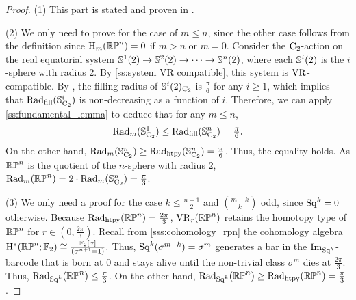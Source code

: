 \begin{proof}
	(1) This part is stated and proven in \cite[Thm.~4.5]{adams2022metric}.

	\smallskip (2) We only need to prove for the case of $m\leq n$, since the other case follows from the definition since \(\mathrm{H}_m(\mathbb{RP}^n) = 0\) if \(m > n\) or \(m = 0\).
    Consider the \(\mathrm{C}_2\)-action on the real equatorial system \(\mathbb{S}^{1}(2) \to \mathbb{S}^{2}(2) \to \dotsb \to \mathbb{S}^{n}(2)\), where each $\mathbb{S}^{i}(2)$ is the $i$-sphere with radius $2$.
    By \cref{ss:system VR compatible}, this system is \(\mathrm{VR}\)-compatible.
    By \cite{katz1983filling}, the filling radius of $\mathbb{S}^{i}(2)_{\mathrm{C}_2}$ is $\frac{\pi}{6}$ for any $i \geq 1$, which implies that $\mathrm{Rad}_{\mathrm{fill}}(\mathbb{S}^{i}_{\mathrm{C}_2})$ is non-decreasing as a function of \(i\).
    Therefore, we can apply \cref{ss:fundamental_lemma} to deduce that for any \(m \leq n\),
    \[
    \mathrm{Rad}_{m}(\mathbb{S}^{1}_{\mathrm{C}_2}) \leq \mathrm{Rad}_{\mathrm{fill}}(\mathbb{S}^{n}_{\mathrm{C}_2}) = \tfrac{\pi}{6}.
    \]
    On the other hand, $\mathrm{Rad}_{m}(\mathbb{S}^{n}_{\mathrm{C}_2})\geq \mathrm{Rad}_{\mathrm{htpy}}(\mathbb{S}^{n}_{\mathrm{C}_2}) = \tfrac{\pi}{6}$.
    Thus, the equality holds.
    As $\mathbb{RP}^n$ is the quotient of the $n$-sphere with radius $2$, $\mathrm{Rad}_{m}(\mathbb{RP}^n) = 2\cdot \mathrm{Rad}_{m}(\mathbb{S}^{n}_{\mathrm{C}_2}) = \frac{\pi}{3}$.


	\smallskip (3) We only need a proof for the case $k \leq \frac{n-1}{2}$ and $\binom{m-k}{k}$ odd, since \(\mathrm{Sq}^k = 0\) otherwise.
	Because $\mathrm{Rad}_{\mathrm{htpy}}(\mathbb{RP}^n)=\frac{2\pi}{3}$, $\mathrm{VR}_r(\mathbb{RP}^n)$ retains the homotopy type of $\mathbb{RP}^n$ for $r \in (0,\tfrac{2\pi}{3})$.
    Recall from \cref{sss:cohomology_rpn} the cohomology algebra \(\mathrm{H}^\ast(\mathbb{RP}^n; {\mathbb{F}_2}) \cong \frac{{\mathbb{F}_2}[\sigma]}{(\sigma^{n+1} = 1)}.\)
    Thus, $\mathrm{Sq}^k(\sigma^{m-k}) = \sigma^{m}$ generates a bar in the $\operatorname{Im}_{\mathrm{Sq}^k}$-barcode that is born at $0$ and stays alive until the non-trivial class $\sigma^{m}$ dies at $\tfrac{2\pi}{3}$.
	Thus, $\mathrm{Rad}_{\mathrm{Sq}^k}(\mathbb{RP}^n) \leq \tfrac{\pi}{3}$.
	On the other hand, $\mathrm{Rad}_{\mathrm{Sq}^k}(\mathbb{RP}^n) \geq \mathrm{Rad}_{\mathrm{htpy}}(\mathbb{RP}^n) = \tfrac{\pi}{3}$.
\end{proof}

